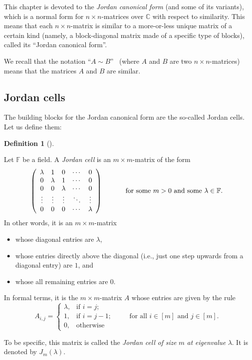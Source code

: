 \documentclass[numbers=enddot,12pt,final,onecolumn,notitlepage]{scrartcl}%
\numberwithin{exer}{subsection}
\theoremstyle{definition}
\newtheorem{defi}[theo]{Definition}
\newenvironment{definition}[1][]
{\begin{defi}[#1]\begin{leftbar}}
{\end{leftbar}\end{defi}}
\begin{document}
This chapter is devoted to the \emph{Jordan canonical form} (and some of its
variants), which is a normal form for $n\times n$-matrices over $\mathbb{C}$
with respect to similarity. This means that each $n\times n$-matrix is similar
to a more-or-less unique matrix of a certain kind (namely, a block-diagonal
matrix made of a specific type of blocks), called its \textquotedblleft Jordan
canonical form\textquotedblright.

We recall that the notation \textquotedblleft$A\sim B$\textquotedblright%
\ (where $A$ and $B$ are two $n\times n$-matrices) means that the matrices $A$
and $B$ are similar.

\subsection{Jordan cells}

The building blocks for the Jordan canonical form are the so-called Jordan
cells. Let us define them:

\begin{definition}
\label{def.jnf.jcell}Let $\mathbb{F}$ be a field. A \emph{Jordan cell} is an
$m\times m$-matrix of the form%
\[
\left(
\begin{array}
[c]{ccccc}%
\lambda & 1 & 0 & \cdots & 0\\
0 & \lambda & 1 & \cdots & 0\\
0 & 0 & \lambda & \cdots & 0\\
\vdots & \vdots & \vdots & \ddots & \vdots\\
0 & 0 & 0 & \cdots & \lambda
\end{array}
\right)  \ \ \ \ \ \ \ \ \ \ \text{for some }m>0\text{ and some }\lambda
\in\mathbb{F}.
\]
In other words, it is an $m\times m$-matrix

\begin{itemize}
\item whose diagonal entries are $\lambda$,

\item whose entries directly above the diagonal (i.e., just one step upwards
from a diagonal entry) are $1$, and

\item whose all remaining entries are $0$.
\end{itemize}

\noindent In formal terms, it is the $m\times m$-matrix $A$ whose entries are
given by the rule%
\[
A_{i,j}=%
\begin{cases}
\lambda, & \text{if }i=j;\\
1, & \text{if }i=j-1;\\
0, & \text{otherwise}%
\end{cases}
\ \ \ \ \ \ \ \ \ \ \text{for all }i\in\left[  m\right]  \text{ and }%
j\in\left[  m\right]  .
\]


To be specific, this matrix is called the \emph{Jordan cell of size }$m$\emph{
at eigenvalue }$\lambda$. It is denoted by $J_{m}\left(  \lambda\right)  $.
\end{definition}
\end{document}
